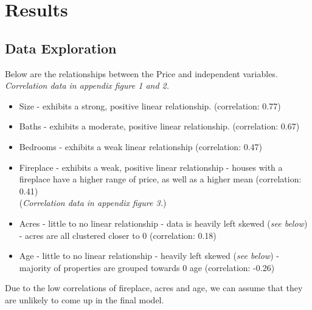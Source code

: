\documentclass[10pt,A4,makeidx]{article}
\begin{document}
\section{Results}
  \subsection{Data Exploration}

  Below are the relationships between the Price and independent variables.\\
  \emph{Correlation data in appendix figure 1 and 2.}
  \begin{itemize}
    \item Size - exhibits a strong, positive linear relationship. (correlation: 0.77)
    \item Baths - exhibits a moderate, positive linear relationship. (correlation: 0.67)
    \item Bedrooms - exhibits a weak linear relationship (correlation: 0.47)
    \item Fireplace - exhibits a weak, positive linear relationship - houses 
    with a fireplace have a higher range of price, as well as a higher mean (correlation: 0.41)
    \\(\emph{Correlation data in appendix figure 3.})
    \item Acres - little to no linear relationship - data is heavily left skewed (\emph{see below})  
      \subitem - acres are all clustered closer to 0 (correlation: 0.18)
    \item Age - little to no linear relationship - heavily left skewed (\emph{see below})
      \subitem - majority of properties are grouped
    towards 0 age (correlation: -0.26)\\
  \end{itemize}
  
  Due to the low correlations of fireplace, acres and age, we can assume that
  they are unlikely to come up in the final model.
  
\end{document}
